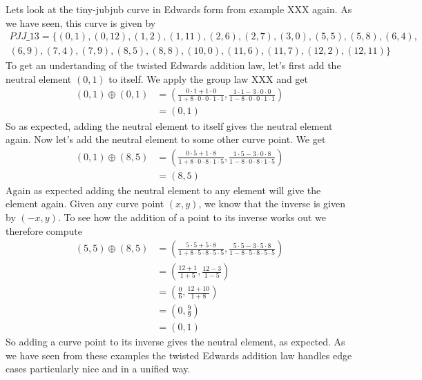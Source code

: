 \begin{example} Lets look at the tiny-jubjub curve in Edwards form from example XXX again. As we have seen, this curve is given by
\begin{multline*}
\mathit{PJJ\_13} = \{(0, 1),(0, 12),(1, 2),(1, 11),(2, 6),(2, 7),(3, 0),(5, 5),(5, 8),(6, 4),\\
(6, 9),(7, 4),(7, 9),(8, 5),(8, 8),(10, 0),(11, 6),(11, 7),(12, 2),(12, 11)\}
\end{multline*}
To get an undertanding of the twisted Edwards addition law, let's first add the neutral element $(0,1)$ to itself. We apply the group law XXX and get
\begin{align*}
(0, 1) \oplus (0, 1) &= \left(\frac{0\cdot 1+1 \cdot 0}{1 +8\cdot0\cdot 0\cdot 1\cdot 1},\frac{1\cdot 1-3\cdot 0\cdot 0}{1-8\cdot 0\cdot 0\cdot 1\cdot 1}\right)\\
                     & = (0,1)
\end{align*}
So as expected, adding the neutral element to itself gives the neutral element again. Now let's add the neutral element to some other curve point. We get
\begin{align*}
(0, 1) \oplus (8, 5) &= \left(\frac{0\cdot 5+1 \cdot 8}{1 +8\cdot0\cdot 8\cdot 1\cdot 5},\frac{1\cdot 5 - 3\cdot 0\cdot 8}{1-8\cdot 0\cdot 8\cdot 1\cdot 5}\right)\\
                     & = (8,5)
\end{align*}
Again as expected adding the neutral element to any element will give the element again. Given any curve point $(x,y)$, we know that the inverse is given by $(-x,y)$. To see how the addition of a point to its inverse works out we therefore compute 
\begin{align*}
(5, 5) \oplus (8, 5) &= \left(\frac{5\cdot 5+5 \cdot 8}{1 +8\cdot 5\cdot 8\cdot 5\cdot 5},\frac{5\cdot 5 - 3\cdot 5\cdot 8}{1-8\cdot 5\cdot 8\cdot 5\cdot 5}\right)\\
                     &= \left(\frac{12+1}{1 +5},\frac{12 - 3}{1-5}\right)\\
                     &= \left(\frac{0}{6},\frac{12 + 10}{1+8}\right)\\
                     &= \left(0,\frac{9}{9}\right)\\
                     &=  (0,1)
\end{align*}
So adding a curve point to its inverse gives the neutral element, as expected. As we have seen from these examples the twisted Edwards addition law handles edge cases particularly nice and in a unified way.
\end{example}

